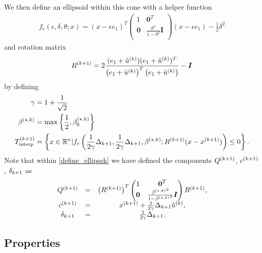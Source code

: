 We then define an ellipsoid within this cone with a helper function
\begin{align}
f_e(\epsilon, \delta, \theta; x) = (x - \epsilon e_1)^T\begin{pmatrix}
1 & \boldsymbol0^T \\
\boldsymbol 0 & \frac{\theta^2}{1 - \theta^2} \boldsymbol I \\
\end{pmatrix}(x - \epsilon e_1) - \frac 1 2 \delta^2 \label{define_ellipse_function}
\end{align}
and rotation matrix
\begin{align}
{R^{(k+1)}} = 2\frac{(e_1 + {{\hat u}^{(k)}})(e_1 + {{\hat u}^{(k)}})^T}{\left(e_1 + {{\hat u}^{(k)}}\right)^T\left(e_1 + {{\hat u}^{(k)}}\right)} - \boldsymbol I \label{define_rotation}
\end{align}
by defining
\begin{align}
\gamma &= 1 + \frac 1 {\sqrt{2}} \label{define_the_constant_gamma} \\
{\beta^{(\star, k)}} &= \max\left\{\frac 1 2 , {\beta_0^{(\star, k)}}\right\} \label{define_bs} \\
{T_{\text{interp}}^{(k+1)}} &= \left\{x \in \mathbb R^n | f_e\left(\frac 1 {2\gamma} \Delta_{k+1}, \frac 1 {2\gamma} \Delta_{k+1},{\beta^{(\star, k)}}; {R^{(k+1)}}(x - {{x}^{(k+1)}})\right) \le 0\right\}. \label{define_ellipsek}
\end{align}
Note that within \cref{define_ellipsek} we have defined the components ${Q^{(k+1)}}$, ${c^{(k+1)}}$, ${\delta_{k+1}}$ as
\begin{align}
\begin{array}{ccc}
{Q^{(k+1)}} &=& \left({R^{(k+1)}}\right)^T \begin{pmatrix}
1 & \boldsymbol0^T \\
\boldsymbol 0 & \frac{{\beta^{(\star, k)}}^2}{1 - {\beta^{(\star, k)}}^2} \boldsymbol I \\
\end{pmatrix} {R^{(k+1)}}, \\
{c^{(k+1)}} &=& {{x}^{(k+1)}} + \frac 1 {2\gamma} \Delta_{k+1} {{\hat u}^{(k)}}, \\
{\delta_{k+1}} &=& \frac 1 {2\gamma} \Delta_{k+1}. 
\end{array}\label{conservative_ellipsoid_details}
\end{align}


\subsection{Properties}
\label{feasible_ellipsoid_analysis}

